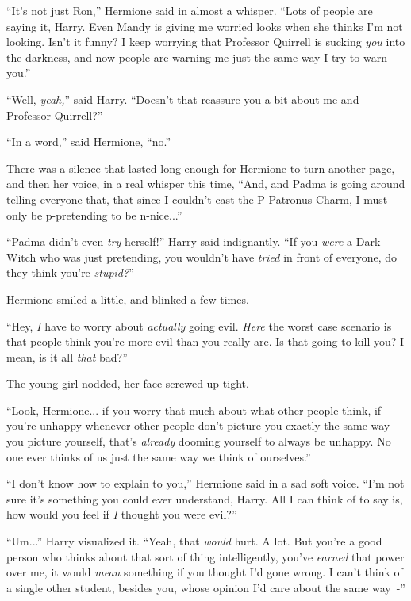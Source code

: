 ``It's not just Ron,'' Hermione said in almost a whisper. ``Lots of people are saying it, Harry. Even Mandy is giving me worried looks when she thinks I'm not looking. Isn't it funny? I keep worrying that Professor Quirrell is sucking \emph{you} into the darkness, and now people are warning me just the same way I try to warn you.''

``Well, \emph{yeah,}'' said Harry. ``Doesn't that reassure you a bit about me and Professor Quirrell?''

``In a word,'' said Hermione, ``no.''

There was a silence that lasted long enough for Hermione to turn another page, and then her voice, in a real whisper this time, ``And, and Padma is going around telling everyone that, that since I couldn't cast the P-Patronus Charm, I must only be p-pretending to be n-nice...''

``Padma didn't even \emph{try} herself!'' Harry said indignantly. ``If you \emph{were} a Dark Witch who was just pretending, you wouldn't have \emph{tried} in front of everyone, do they think you're \emph{stupid?}''

Hermione smiled a little, and blinked a few times.

``Hey, \emph{I} have to worry about \emph{actually} going evil. \emph{Here} the worst case scenario is that people think you're more evil than you really are. Is that going to kill you? I mean, is it all \emph{that} bad?''

The young girl nodded, her face screwed up tight.

``Look, Hermione... if you worry that much about what other people think, if you're unhappy whenever other people don't picture you exactly the same way you picture yourself, that's \emph{already} dooming yourself to always be unhappy. No one ever thinks of us just the same way we think of ourselves.''

``I don't know how to explain to you,'' Hermione said in a sad soft voice. ``I'm not sure it's something you could ever understand, Harry. All I can think of to say is, how would you feel if \emph{I} thought you were evil?''

``Um...'' Harry visualized it. ``Yeah, that \emph{would} hurt. A lot. But you're a good person who thinks about that sort of thing intelligently, you've \emph{earned} that power over me, it would \emph{mean} something if you thought I'd gone wrong. I can't think of a single other student, besides you, whose opinion I'd care about the same way~-''

